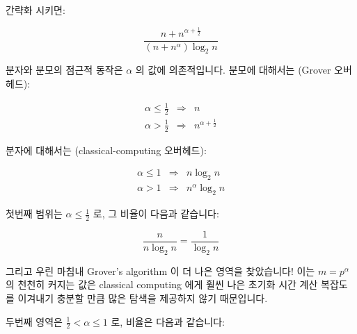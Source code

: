 간략화 시키면:

\begin{equation}
	\frac{n + n^{\alpha + \frac{1}{2}}}{\left( n + n^\alpha \right) \log_2 n}
\end{equation}

분자와 분모의 점근적 동작은 $\alpha$ 의 값에 의존적입니다.
분모에 대해서는 (Grover 오버헤드):

\begin{eqnarray}
	\alpha \leq \frac{1}{2} & \Rightarrow & n \\
	\alpha > \frac{1}{2} & \Rightarrow & n^{\alpha + \frac{1}{2}}
\end{eqnarray}

분자에 대해서는 (classical-computing 오버헤드):

\begin{eqnarray}
	\alpha \leq 1 & \Rightarrow & n \log_2 n \\
	\alpha > 1 & \Rightarrow & n^\alpha \log_2 n
\end{eqnarray}

첫번째 범위는 $\alpha \leq \frac{1}{2}$ 로, 그 비율이 다음과 같습니다:

\begin{equation}
	\frac{n}{n \log_2 n} = \frac{1}{\log_2 n}
\end{equation}

그리고 우린 마침내 Grover's algorithm 이 더 나은 영역을 찾았습니다!
이는 $m = p^\alpha$ 의 천천히 커지는 값은 classical computing 에게 훨씬 나은
초기화 시간 계산 복잡도를 이겨내기 충분할 만큼 많은 탐색을 제공하지 않기
때문입니다.

두번째 영역은 $\frac{1}{2} < \alpha \leq 1$ 로, 비율은 다음과 같습니다:

